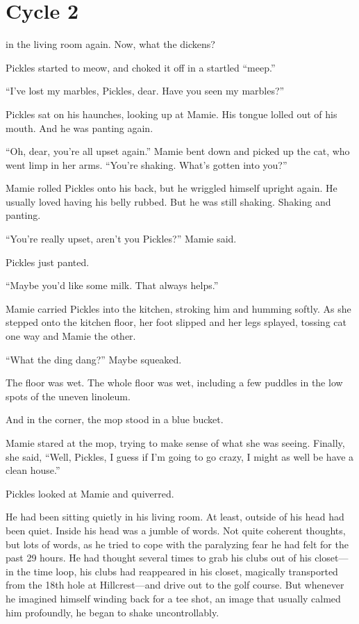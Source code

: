 \chapter{Cycle 2}


 in the living room again. Now, what the dickens?

Pickles started to meow, and choked it off in a startled ``meep.''

``I've lost my marbles, Pickles, dear. Have you seen my marbles?''

Pickles sat on his haunches, looking up at Mamie. His tongue lolled out of his mouth. And he was panting again.

``Oh, dear, you're all upset again.'' Mamie bent down and picked up the cat, who went limp in her arms. ``You're shaking. What's gotten into you?''

Mamie rolled Pickles onto his back, but he wriggled himself upright again. He usually loved having his belly rubbed. But he was still shaking. Shaking and panting.

``You're really upset, aren't you Pickles?'' Mamie said.

Pickles just panted.

``Maybe you'd like some milk. That always helps.''

Mamie carried Pickles into the kitchen, stroking him and humming softly. As she stepped onto the kitchen floor, her foot slipped and her legs splayed, tossing cat one way and Mamie the other.

``What the ding dang?'' Maybe squeaked.

The floor was wet. The whole floor was wet, including a few puddles in the low spots of the uneven linoleum.

And in the corner, the mop stood in a blue bucket.

Mamie stared at the mop, trying to make sense of what she was seeing. Finally, she said, ``Well, Pickles, I guess if I'm going to go crazy, I might as well be have a clean house.''

Pickles looked at Mamie and quiverred.




 He had been sitting quietly in his living room. At least, outside of his head had been quiet. Inside his head was a jumble of words. Not quite coherent thoughts, but lots of words, as he tried to cope with the paralyzing fear he had felt for the past 29 hours. He had thought several times to grab his clubs out of his closet—in the time loop, his clubs had reappeared in his closet, magically transported from the 18th hole at Hillcrest—and drive out to the golf course. But whenever he imagined himself winding back for a tee shot, an image that usually calmed him profoundly, he began to shake uncontrollably.

